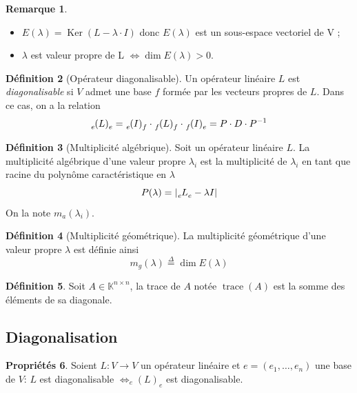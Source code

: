 \documentclass[11pt,a4paper]{article}
\theoremstyle{definition}
\newtheorem{mydef}{Définition}%
\newtheorem{myprop}[mydef]{Propriétés}
\newtheorem{myrem}[mydef]{Remarque}
\DeclareMathOperator{\trace}{trace}
\DeclareMathOperator{\newker}{Ker}
\DeclareMathOperator{\newdim}{dim}
\newcommand{\eqdef}{\stackrel{\Delta}{=}}
\newcommand{\K}{\mathbb{K}}
\newcommand{\Knn}{\K^{n \times n}}
\newcommand*\InsertTheoremBreak{%
	\begingroup %
		\setlength\itemsep{0pt}%
		\setlength\parsep{0pt}%
		\item[\vbox{\null}]%
	\endgroup%
}%
\begin{document}
\begin{myrem}
	\InsertTheoremBreak
	\begin{itemize}
		\item $E(\lambda) = \newker (L - \lambda \cdot I)$ donc $E(\lambda)$ est un sous-espace vectoriel de V ;
		\item $\lambda$ est valeur propre de L $\Leftrightarrow \newdim E(\lambda) > 0$.
	\end{itemize}
\end{myrem}

\begin{mydef}[Opérateur diagonalisable]
	Un opérateur linéaire $L$ est \emph{diagonalisable} si $V$ admet une base $f$ formée par les vecteurs propres de $L$. Dans ce cas, on a la relation
	\[ \tensor*[_e]{(L)}{_e}
	= \tensor*[_e]{(I)}{_f} \cdot \tensor*[_f]{(L)}{_f} \cdot \tensor*[_f]{(I)}{_e}
	= P \cdot D \cdot P^{-1} \]
\end{mydef}

\begin{mydef}[Multiplicité algébrique]
	Soit un opérateur linéaire $L$.
	La multiplicité algébrique d'une valeur propre $\lambda_i$ est la multiplicité de $\lambda_i$ en tant que racine du polynôme caractéristique en $\lambda$
	\[ P(\lambda) = \left| \tensor*[_e]{L}{_e} - \lambda I \right| \]
	On la note $m_a(\lambda_i)$.
\end{mydef}

\begin{mydef}[Multiplicité géométrique]
	La multiplicité géométrique d'une valeur propre $\lambda$ est définie ainsi
	\[ m_g(\lambda) \eqdef \newdim E(\lambda) \]
\end{mydef}

\begin{mydef}
	Soit $A \in \Knn$,
	la trace de $A$ notée $\trace(A)$ est la somme des éléments de sa diagonale.
\end{mydef}

\subsection{Diagonalisation}

\begin{myprop}
	Soient $L : V \to V$ un opérateur linéaire et $e = (e_1, \dots, e_n)$ une base de $V$:
	$L$ est diagonalisable $\Leftrightarrow _e\!(L)_e$ est diagonalisable.
\end{myprop}
\end{document}
